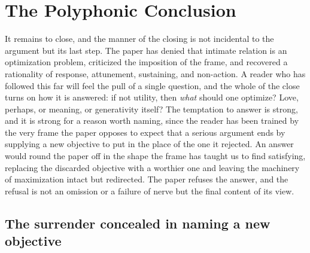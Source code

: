 \section{The Polyphonic Conclusion}
\label{p25:sec:polyphony}

\noindent
It remains to close, and the manner of the closing is not incidental to the argument but its last step. The paper has denied that intimate relation is an optimization problem, criticized the imposition of the frame, and recovered a rationality of response, attunement, sustaining, and non-action. A reader who has followed this far will feel the pull of a single question, and the whole of the close turns on how it is answered: if not utility, then \emph{what} should one optimize? Love, perhaps, or meaning, or generativity itself? The temptation to answer is strong, and it is strong for a reason worth naming, since the reader has been trained by the very frame the paper opposes to expect that a serious argument ends by supplying a new objective to put in the place of the one it rejected. An answer would round the paper off in the shape the frame has taught us to find satisfying, replacing the discarded objective with a worthier one and leaving the machinery of maximization intact but redirected. The paper refuses the answer, and the refusal is not an omission or a failure of nerve but the final content of its view.

\subsection*{The surrender concealed in naming a new objective}

